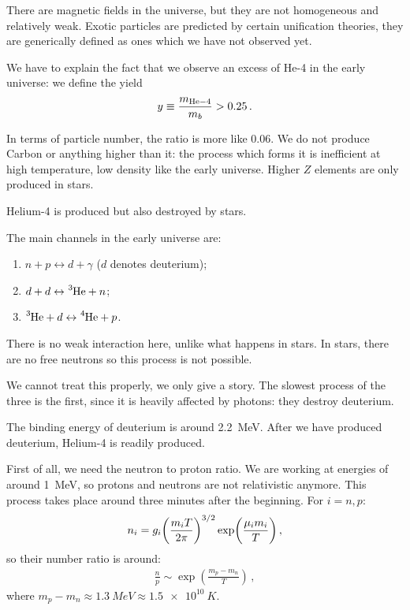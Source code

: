 \documentclass[main.tex]{subfiles}
\begin{document}
There are magnetic fields in the universe, but they are not homogeneous and relatively weak.
Exotic particles are predicted by certain unification theories, they are generically defined as ones which we have not observed yet.

We have to explain the fact that we observe an excess of He-4 in the early universe: we define the yield 
%
\begin{align}
  y \equiv \frac{m_{\ce{He-4}}}{m_b} > \num{.25}
\,.
\end{align}

In terms of particle number, the ratio is more like \num{.06}. 
We do not produce Carbon or anything higher than it: the process which forms it is inefficient at high temperature, low density like the early universe.
Higher \(Z\) elements are only produced in stars.

Helium-4 is produced but also destroyed by stars.

The main channels in the early universe are: 

\begin{enumerate}
    \item \(n+p \leftrightarrow d + \gamma \) (\(d\) denotes deuterium);
    \item \(d + d \leftrightarrow \ce{^{3}He} + n\);
    \item \(\ce{^{3}He} + d \leftrightarrow \ce{^{4}He} + p\).
\end{enumerate}

There is no weak interaction here, unlike what happens in stars.
In stars, there are no free neutrons so this process is not possible.

We cannot treat this properly, we only give a story.
The slowest process of the three is the first, since it is heavily affected by photons: they destroy deuterium.

The binding energy of deuterium is around \SI{2.2}{MeV}. After we have produced deuterium, Helium-4 is readily produced.

First of all, we need the neutron to proton ratio.
We are working at energies of around \SI{1}{MeV}, so protons and neutrons are not relativistic anymore.
This process takes place around three minutes after the beginning.
For \(i = n, p\): 
%
\begin{align}
  n_i = g_{i} \qty(\frac{m_i T}{2 \pi })^{3/2} \exp(\frac{\mu_i  m_i}{T})
\,,
\end{align}
%
so their number ratio is around: 
%
\begin{align}
  \frac{n}{p} \sim \exp(\frac{m_p- m_n}{T})
\,,
\end{align}
%
where \(m_p - m_n \approx \SI{1.3}{MeV} \approx \SI{1.5e10}{K}\).
\end{document}
